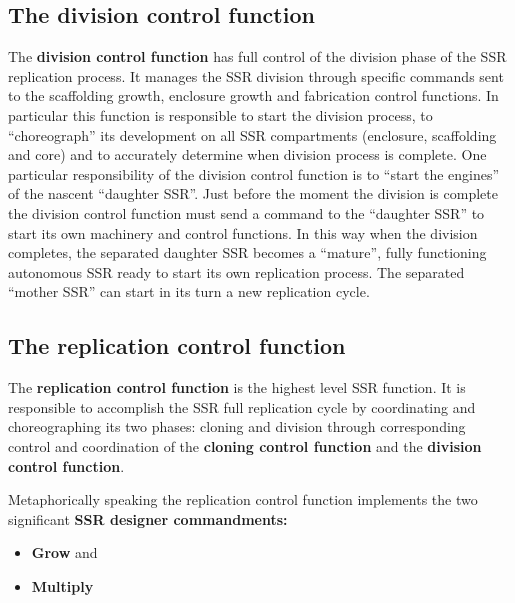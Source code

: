\documentclass[letterpaper]{article}
\begin{document}
\bigskip

\subsection[The division control function]{The division control
function}
\hypertarget{RefHeading3102306210128}{}The \textbf{division control
function} has full control of the division phase of the SSR replication
process. It manages the SSR division through specific commands sent to
the scaffolding growth, enclosure growth and fabrication control
functions.  In particular this function is responsible to start the
division process, to “choreograph” its development on all SSR
compartments (enclosure, scaffolding and core) and to accurately
determine when division process is complete. One particular
responsibility of the division control function is to “start the
engines” of the nascent “daughter SSR”. Just before the moment the
division is complete the division control function must send a command
to the “daughter SSR” to start its own machinery and control functions.
In this way when the division completes, the separated daughter SSR
becomes a “mature”, fully functioning autonomous SSR ready to start its
own replication process. The separated “mother SSR” can start in its
turn a new replication cycle.


\bigskip

\subsection[The replication control function]{The replication control
function}
\hypertarget{RefHeading3104306210128}{}The \textbf{replication control
function} is the highest level SSR function. It is responsible to
accomplish the SSR full replication cycle by coordinating and
choreographing its two phases: cloning and division through
corresponding control and coordination of the \textbf{cloning control
function} and the \textbf{division control function}.


\bigskip

 Metaphorically speaking the replication control function implements the
two significant \textbf{SSR designer commandments:}


\bigskip

\begin{itemize}
\item \textbf{Grow} and
\item \textbf{Multiply}
\end{itemize}
\end{document}
